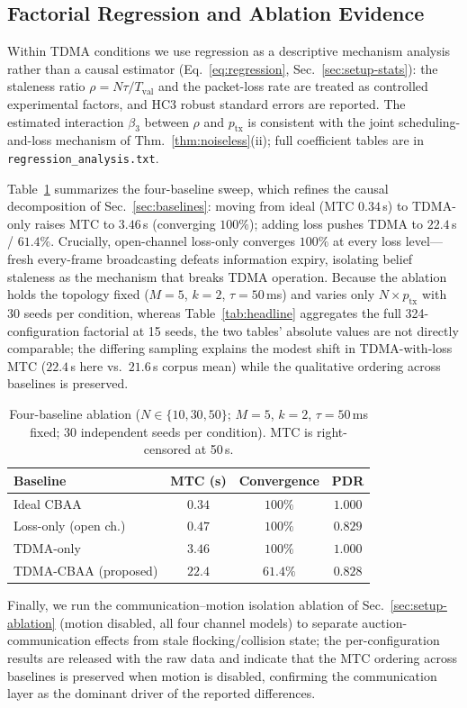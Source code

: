\subsection{Factorial Regression and Ablation Evidence}\label{sec:results-regression}
Within TDMA conditions we use regression as a descriptive mechanism analysis rather than a causal estimator (Eq.~\eqref{eq:regression}, Sec.~\ref{sec:setup-stats}): the staleness ratio $\rho = N\tau/T_{\mathrm{val}}$ and the packet-loss rate are treated as controlled experimental factors, and HC3 robust standard errors are reported. The estimated interaction $\beta_3$ between $\rho$ and $p_{\mathrm{tx}}$ is consistent with the joint scheduling-and-loss mechanism of Thm.~\ref{thm:noiseless}(ii); full coefficient tables are in \texttt{regression\_analysis.txt}.

Table~\ref{tab:ablation} summarizes the four-baseline sweep, which refines the causal decomposition of Sec.~\ref{sec:baselines}: moving from ideal (MTC $0.34$\,s) to TDMA-only raises MTC to
$3.46$\,s (converging $100\%$); adding loss pushes TDMA to $22.4$\,s
/ $61.4\%$. Crucially, open-channel loss-only converges $100\%$ at every loss level---fresh every-frame broadcasting defeats information expiry, isolating belief staleness as the mechanism that breaks TDMA operation.
Because the ablation holds the topology fixed ($M{=}5$, $k{=}2$, $\tau{=}50$\,ms) and varies only $N \times p_{\mathrm{tx}}$ with 30 seeds per condition, whereas Table~\ref{tab:headline} aggregates the full 324-configuration factorial at 15 seeds, the two tables' absolute values are not directly comparable; the differing sampling explains the modest shift in TDMA-with-loss MTC ($22.4$\,s here vs.\ $21.6$\,s corpus mean) while the qualitative ordering across baselines is preserved.

\begin{table}[htbp]
\centering
\caption{Four-baseline ablation ($N \in \{10,30,50\}$; $M{=}5$, $k{=}2$, $\tau{=}50$\,ms fixed; 30 independent seeds per condition). MTC is right-censored at 50\,s.}
\label{tab:ablation}
\begin{tabular}{@{}lccc@{}}
\toprule
Baseline & MTC (s) & Convergence & PDR \\
\midrule
Ideal CBAA            & $0.34$ & $100\%$   & $1.000$ \\
Loss-only (open ch.)  & $0.47$ & $100\%$   & $0.829$ \\
TDMA-only             & $3.46$ & $100\%$   & $1.000$ \\
TDMA-CBAA (proposed)  & $22.4$ & $61.4\%$  & $0.828$ \\
\bottomrule
\end{tabular}
\end{table}

Finally, we run the communication--motion isolation ablation of Sec.~\ref{sec:setup-ablation} (motion disabled, all four channel models) to separate auction-communication effects from stale flocking/collision state; the per-configuration results are released with the raw data and indicate that the MTC ordering across baselines is preserved when motion is disabled, confirming the communication layer as the dominant driver of the reported differences.
